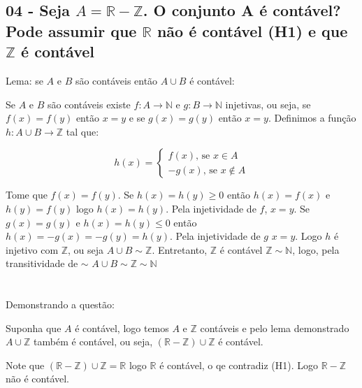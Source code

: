 \subsection*{
04 - Seja $ A = \mathbb{R} - \mathbb{Z} $. O conjunto A é contável?
\\
Pode assumir que $\mathbb{R}$ não é contável (H1) e que $ \mathbb{Z} $ é contável
}

Lema: se $ A $ e $ B $ são contáveis então $ A \cup B $ é contável:

Se $ A $ e $ B $ são contáveis existe $ f \colon A \to \mathbb{N} $ e $ g \colon B \to \mathbb{N} $ injetivas, ou seja, se $ f(x) = f(y) $ então $ x = y $ e se $ g(x) = g(y) $ então $ x = y $. Definimos a função $ h \colon A \cup B \to \mathbb{Z} $ tal que:

\[   
h(x) = 
\begin{cases}
	f(x) \text{, se } x \in A \\
	-g(x) \text{, se } x \notin A
\end{cases}
\]

Tome que $ f(x) = f(y) $. Se $ h(x) = h(y) \geq 0 $ então $ h(x) = f(x) $ e $ h(y) = f(y) $ logo $ h(x) = h(y) $. Pela injetividade de $ f $, $ x = y $. Se $ g(x) = g(y) $ e $ h(x) = h(y) \leq 0 $ então $ h(x) = -g(x) = -g(y) = h(y) $. Pela injetividade de $ g $ $ x = y $. Logo $ h $ é injetivo com $ \mathbb{Z} $, ou seja $ A \cup B \sim \mathbb{Z} $. Entretanto, $ \mathbb{Z} $ é contável $ \mathbb{Z} \sim \mathbb{N} $, logo, pela transitividade de $ \sim $ $ A \cup B \sim \mathbb{Z} \sim \mathbb{N} $
\\~\\~\\
Demonstrando a questão:

Suponha que $ A $ é contável, logo temos $ A $ e $ \mathbb{Z} $ contáveis e pelo lema demonstrado $ A \cup \mathbb{Z} $ também é contável, ou seja, $ (\mathbb{R} - \mathbb{Z}) \cup \mathbb{Z} $ é contável.

Note que $ (\mathbb{R} - \mathbb{Z}) \cup \mathbb{Z} = \mathbb{R} $ logo $ \mathbb{R} $ é contável, o qe contradiz (H1). Logo $ \mathbb{R} - \mathbb{Z} $ não é contável. 
